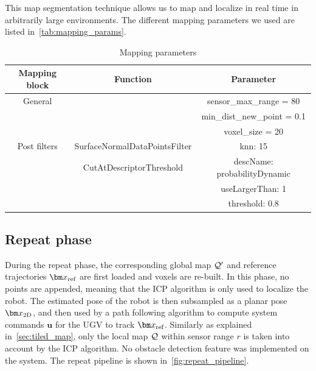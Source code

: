 This map segmentation technique allows us to map and localize in real time in arbitrarily large environments.
The different mapping parameters we used are listed in~\autoref{tab:mapping_params}.


\begin{table}[htpb]
	\caption{Mapping parameters}
	\begin{center}
		\begin{tabular}{c c c} \toprule
			Mapping block & Function                      & Parameter                    \\
			\midrule
			General       &                               & sensor\_max\_range = 80      \\
			              &                               & min\_dist\_new\_point = 0.1  \\
			              &                               & voxel\_size = 20             \\
			\midrule
			Post filters  & SurfaceNormalDataPointsFilter & knn: 15                      \\
			              & CutAtDescriptorThreshold      & descName: probabilityDynamic \\
			              &                               & useLargerThan: 1             \\
			              &                               & threshold: 0.8               \\
			\bottomrule
		\end{tabular}
	\end{center}
	\label{tab:mapping_params}
\end{table}

\subsection{Repeat phase}
\label{sec:repeat_phase}

During the repeat phase, the corresponding global map $\mathcal{Q}'$ and reference trajectories $\reftraj$ are first loaded and voxels are re-built.
In this phase, no points are appended, meaning that the \ac{ICP} algorithm is only used to localize the robot.
The estimated pose of the robot \transform{\robotf}{\mapf} is then subsampled as a planar pose $\poseplane$, and then used by a path following algorithm to compute system commands $\bm u$ for the \ac{UGV} to track $\reftraj$.
Similarly as explained in~\autoref{sec:tiled_map}, only the local map $\mathcal{Q}$ within sensor range $r$ is taken into account by the \ac{ICP} algorithm.
No obstacle detection feature was implemented on the system.
The repeat pipeline is shown in~\autoref{fig:repeat_pipeline}.

